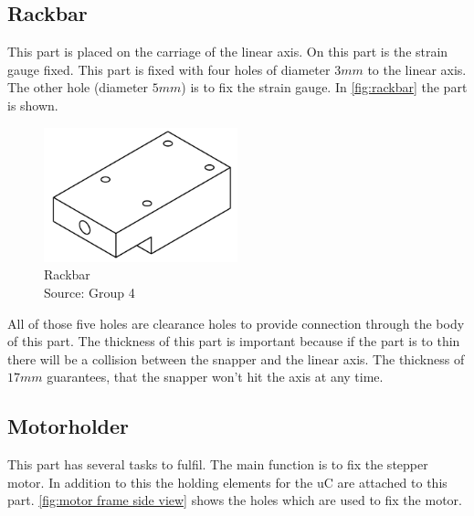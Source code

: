 \documentclass[a4paper,12pt]{scrreprt}
\begin{document}
 \subsection{Rackbar}

This part is placed on the carriage of the linear axis. On this part is the strain gauge fixed. This part is fixed with four holes of diameter $3mm$ to the linear axis. The other hole (diameter $5mm$) is to fix the strain gauge. In \autoref{fig:rackbar} the part is shown.

 \begin{figure}[H]
  \centering
   \includegraphics[width=0.5\textwidth]{pictures/rackbar_5}
   \caption[Rackbar]{Rackbar\\
	Source: Group 4  
  }
   \label{fig:rackbar}
\end{figure} 

All of those five holes are clearance holes to provide connection through the body of this part. The thickness of this part is important because if the part is to thin there will be a collision between the snapper and the linear axis. The thickness of $17mm$ guarantees, that the snapper won't hit the axis at any time.

\subsection{Motorholder}
This part has several tasks to fulfil. The main function is to fix the stepper motor. In addition to this the holding elements for the \acs{uC} are attached to this part. \autoref{fig:motor frame side view} shows the holes which are used to fix the motor. 
\end{document}
